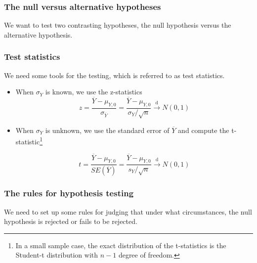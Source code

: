 \documentclass[a4paper,11pt]{article}
\begin{document}
\subsubsection*{The null versus alternative hypotheses}
\label{sec:org5f5bfde}

We want to test two contrasting hypotheses, the null hypothesis versus
the alternative hypothesis. 


\subsubsection*{Test statistics}
\label{sec:orgdc50b8a}

We need some tools for the testing, which is referred to as test
statistics.

\begin{itemize}
\item When \(\sigma_Y\) is known, we use the z-statistics
\[ z = \frac{\overline{Y} -
  \mu_{Y,0}}{\sigma_{\overline{Y}}} = \frac{\overline{Y} -
  \mu_{Y,0}}{\sigma_Y/\sqrt{n}} \xrightarrow{\text{ d }} N(0, 1)\]

\item When \(\sigma_Y\) is unknown, we use the standard error of
\(\overline{Y}\) and compute the t-statistic\footnote{In a small sample case, the exact distribution of the
t-statistics is the Student-t distribution with \(n-1\) degree of
freedom.}

\[ t = \frac{\overline{Y} - \mu_{Y,0}}{SE(\overline{Y})} =
  \frac{\overline{Y} - \mu_{Y,0}}{s_Y/\sqrt{n}} \xrightarrow{ \text{ d } } N(0, 1) \]
\end{itemize}

\subsubsection*{The rules for hypothesis testing}
\label{sec:org2561717}

We need to set up some rules for judging that under what
circumstances, the null hypothesis is rejected or fails
to be rejected. 
\end{document}
